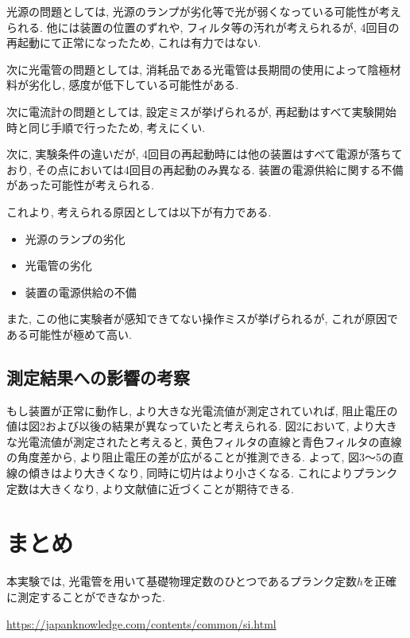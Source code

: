 \documentclass{jarticle}
\begin{document}
光源の問題としては, 光源のランプが劣化等で光が弱くなっている可能性が考えられる.
他には装置の位置のずれや, フィルタ等の汚れが考えられるが, 4回目の再起動にて正常になったため, これは有力ではない.

次に光電管の問題としては, 消耗品である光電管は長期間の使用によって陰極材料が劣化し, 感度が低下している可能性がある.

次に電流計の問題としては, 設定ミスが挙げられるが, 再起動はすべて実験開始時と同じ手順で行ったため, 考えにくい.

次に, 実験条件の違いだが, 4回目の再起動時には他の装置はすべて電源が落ちており, その点においては4回目の再起動のみ異なる.
装置の電源供給に関する不備があった可能性が考えられる.

これより, 考えられる原因としては以下が有力である.

\begin{itemize}
  \item 光源のランプの劣化
  \item 光電管の劣化
  \item 装置の電源供給の不備
\end{itemize}

また, この他に実験者が感知できてない操作ミスが挙げられるが, これが原因である可能性が極めて高い.



\subsection{測定結果への影響の考察}

もし装置が正常に動作し, より大きな光電流値が測定されていれば, 阻止電圧の値は図2および以後の結果が異なっていたと考えられる.
図2において, より大きな光電流値が測定されたと考えると, 黄色フィルタの直線と青色フィルタの直線の角度差から, より阻止電圧の差が広がることが推測できる.
よって, 図3～5の直線の傾きはより大きくなり, 同時に切片はより小さくなる.
これによりプランク定数は大きくなり, より文献値に近づくことが期待できる.



\section{まとめ}

本実験では, 光電管を用いて基礎物理定数のひとつであるプランク定数$h$を正確に測定することができなかった.



\begin{thebibliography}{99}

   \url{https://japanknowledge.com/contents/common/si.html}

\end{thebibliography}
\end{document}
